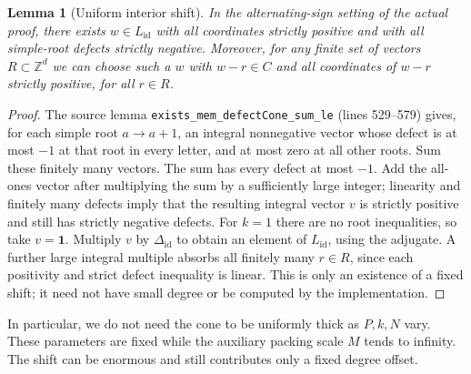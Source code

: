 \documentclass[11pt]{article}
\newtheorem{lemma}[theorem]{Lemma}
\theoremstyle{remark}\newtheorem{remark}[theorem]{Remark}
\newcommand{\Z}{\mathbb Z}\newcommand{\N}{\mathbb N}\newcommand{\R}{\mathbb R}
\newcommand{\code}[1]{\texttt{#1}}
\begin{document}
\begin{lemma}[Uniform interior shift]\label{lem:shift}
In the alternating-sign setting of the actual proof, there exists $w\in L_{\mathrm{id}}$ with all coordinates strictly positive and with all simple-root defects strictly negative. Moreover, for any finite set of vectors $R\subset\Z^d$ we can choose such a $w$ with $w-r\in C$ and all coordinates of $w-r$ strictly positive, for all $r\in R$.
\end{lemma}
\begin{proof}
The source lemma \code{exists\_mem\_defectCone\_sum\_le} (lines 529--579) gives, for each simple root $a\to a+1$, an integral nonnegative vector whose defect is at most $-1$ at that root in every letter, and at most zero at all other roots. Sum these finitely many vectors. The sum has every defect at most $-1$. Add the all-ones vector after multiplying the sum by a sufficiently large integer; linearity and finitely many defects imply that the resulting integral vector $v$ is strictly positive and still has strictly negative defects. For $k=1$ there are no root inequalities, so take $v=\mathbf1$. Multiply $v$ by $\Delta_{\mathrm{id}}$ to obtain an element of $L_{\mathrm{id}}$, using the adjugate. A further large integral multiple absorbs all finitely many $r\in R$, since each positivity and strict defect inequality is linear. This is only an existence of a fixed shift; it need not have small degree or be computed by the implementation.
\end{proof}

In particular, we do not need the cone to be uniformly thick as $P,k,N$ vary. These parameters are fixed while the auxiliary packing scale $M$ tends to infinity. The shift can be enormous and still contributes only a fixed degree offset.
\end{document}
